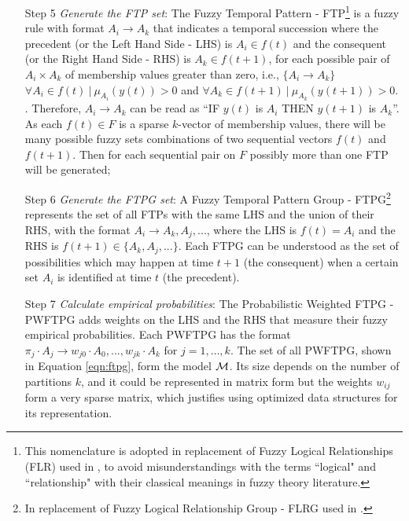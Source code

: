 \begin{enumerate}
\item[Step 5] \textit{Generate the FTP set}: The Fuzzy Temporal Pattern - FTP\footnote{This nomenclature is adopted in replacement of Fuzzy Logical Relationships (FLR) used in \cite{song1993fuzzy}, to avoid misunderstandings with the terms ``logical" and ``relationship" with their classical meanings in fuzzy theory literature.} is a fuzzy rule with format $A_i \rightarrow A_k$ that indicates a temporal succession where the precedent (or the Left Hand Side - LHS) is $A_i \in f(t)$ and the consequent (or the Right Hand Side - RHS) is $A_k \in f(t+1)$, for each possible pair of $A_i \times A_k$ of membership values greater than zero, i.e.,  $\{A_i \rightarrow A_k\}$ $\forall A_i \in f(t)\ |\ \mu_{A_i}(y(t)) > 0$ and $\forall A_k \in f(t+1)\ |\ \mu_{A_k}(y(t+1)) > 0 $. . Therefore, $A_i \rightarrow A_k$ can be read as ``IF $y(t)$ is $A_i$ THEN $y(t+1)$ is $A_k$''.
As each $f(t) \in F$ is a sparse $k$-vector of membership values, there will be many possible fuzzy sets combinations of two sequential vectors $f(t)$ and $f(t+1)$. Then for each sequential pair on $F$ possibly more than one FTP will be generated;

\item[Step 6] \textit{Generate the FTPG set}: A Fuzzy Temporal Pattern Group - FTPG\footnote{In replacement of Fuzzy Logical Relationship Group - FLRG used in \cite{Chen2006}.} represents the set of all FTPs with the same LHS and the union of their RHS, with the format $A_i \rightarrow A_k, A_j,...$, where the LHS is $f(t) = A_i$ and the RHS is $f(t+1) \in \{A_k, A_j,...\}$. Each FTPG can be understood as the set of possibilities which may happen at time $t+1$ (the consequent) when a certain set $A_i$ is identified at time $t$ (the precedent).

\item[Step 7] \textit{Calculate empirical probabilities}: The Probabilistic Weighted FTPG - PWFTPG adds weights on the LHS and the RHS that measure their fuzzy empirical probabilities. Each PWFTPG has the format $\pi_j \cdot A_j \rightarrow  w_{j0} \cdot A_0, ..., w_{jk} \cdot A_k$ for $j = 1,\ldots, k$. The set of all  PWFTPG, shown in Equation \eqref{eqn:ftpg}, form the model $\mathcal{M}$. Its size depends on the number of partitions $k$, and it could be represented in matrix form but the weights $w_{ij}$ form a very sparse matrix, which justifies using optimized data structures for its representation.


\end{enumerate}
